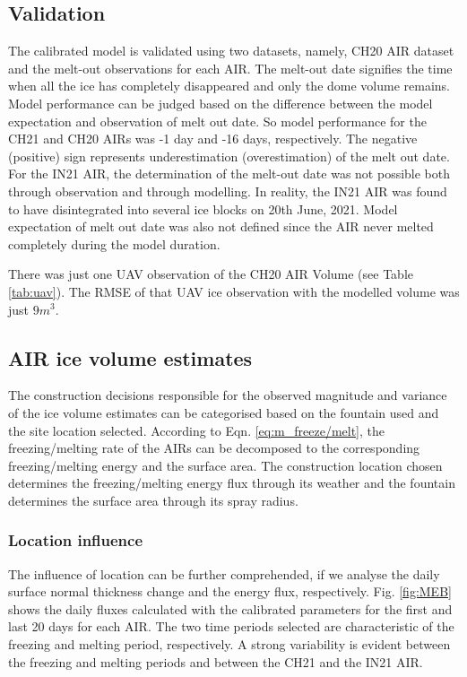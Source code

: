 \documentclass[utf8]{frontiersSCNS} %
\begin{document}
\subsection{Validation}

The calibrated model is validated using two datasets, namely, CH20 AIR dataset and the melt-out observations for
each AIR. The melt-out date signifies the time when all the ice has completely disappeared and only the dome volume
remains. Model performance can be judged based on the difference between the model expectation and observation of
melt out date.  So model performance for the CH21 and CH20 AIRs was -1 day and -16 days, respectively. The negative
(positive) sign represents underestimation (overestimation) of the melt out date. For the IN21 AIR, the
determination of the melt-out date was not possible both through observation and through modelling.  In reality,
the IN21 AIR was found to have disintegrated into several ice blocks on 20th June, 2021.  Model expectation of melt
out date was also not defined since the AIR never melted completely during the model duration.

There was just one UAV observation of the CH20 AIR Volume (see Table \ref{tab:uav}).  The RMSE of that UAV ice
observation with the modelled volume was just $9 m^3$.


\subsection{AIR ice volume estimates}

The construction decisions responsible for the observed magnitude and variance of the ice volume estimates can be
categorised based on the fountain used and the site location selected. According to Eqn. \ref{eq:m_freeze/melt}, the
freezing/melting rate of the AIRs can be decomposed to the corresponding freezing/melting energy and the surface
area. The construction location chosen determines the freezing/melting energy flux through its weather and the
fountain determines the surface area through its spray radius.

\subsubsection{Location influence}

The influence of location can be further comprehended, if we analyse the daily surface normal thickness change and the
energy flux, respectively. Fig.  \ref{fig:MEB} shows the daily fluxes calculated with the calibrated parameters for
the first and last 20 days for each AIR. The two time periods selected are characteristic of the freezing and
melting period, respectively. A strong variability is evident between the freezing and melting periods and between
the CH21 and the IN21 AIR.
\end{document}
